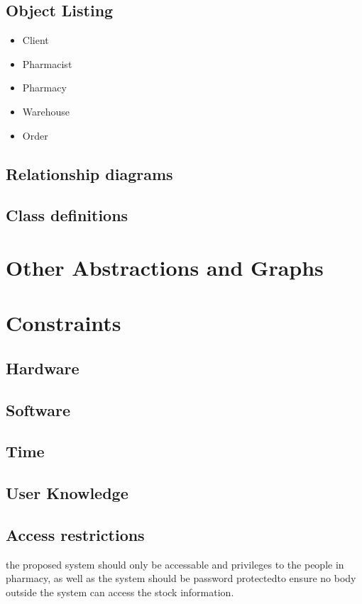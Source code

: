 \subsection{Object Listing}
\begin{itemize}

\item Client
\item Pharmacist
\item Pharmacy
\item Warehouse
\item Order

\end{itemize}
\subsection{Relationship diagrams}

\subsection{Class definitions}

\section{Other Abstractions and Graphs}

\section{Constraints}

\subsection{Hardware}

\subsection{Software}

\subsection{Time}

\subsection{User Knowledge}

\subsection{Access restrictions}
the proposed system should only be accessable and privileges to the people in pharmacy, as well as the system should be password protectedto ensure no body outside the system can access the stock information.
\space

